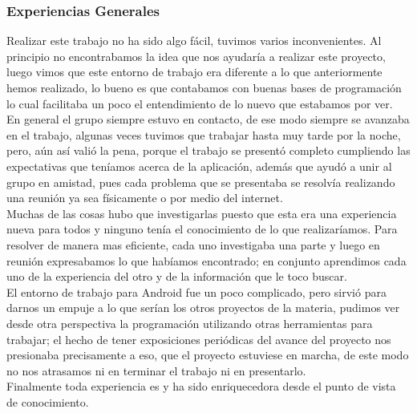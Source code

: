 \documentclass[10pt]{article}
\begin{document}
{\begin{flushleft}
\subsubsection{Experiencias Generales}
Realizar este trabajo no ha sido algo f\'acil, tuvimos varios inconvenientes. Al principio no encontrabamos la idea que nos ayudar\'ia a realizar este proyecto, luego vimos que este entorno de trabajo era diferente a lo que anteriormente hemos realizado, lo bueno es que contabamos con buenas bases de programaci\'on lo cual facilitaba un poco el entendimiento de lo nuevo que estabamos por ver.\\
En general el grupo siempre estuvo en contacto, de ese modo siempre se avanzaba en el trabajo, algunas veces tuvimos que trabajar hasta muy tarde por la noche, pero, a\'un as\'i vali\'o la pena, porque el trabajo se present\'o completo cumpliendo las expectativas que ten\'iamos acerca de la aplicaci\'on, adem\'as que ayud\'o a unir al grupo en amistad, pues cada problema que se presentaba se resolv\'ia realizando una reuni\'on ya sea f\'isicamente o por medio del internet.\\
Muchas de las cosas hubo que investigarlas puesto que esta era una experiencia nueva para todos y ninguno ten\'ia el conocimiento de lo que realizar\'iamos. Para resolver de manera mas eficiente, cada uno investigaba una parte y luego en reuni\'on expresabamos lo que hab\'iamos encontrado; en conjunto aprendimos cada uno de la experiencia del otro y de la informaci\'on que le toco buscar.\\
El entorno de trabajo para Android fue un poco complicado, pero sirvi\'o para darnos un empuje a lo que ser\'ian los otros proyectos de la materia, pudimos ver desde otra perspectiva la programaci\'on utilizando otras herramientas para trabajar; el hecho de tener exposiciones peri\'odicas del avance del proyecto nos presionaba precisamente a eso, que el proyecto estuviese en marcha, de este modo no nos atrasamos ni en terminar el trabajo ni en presentarlo.\\
\vspace{0.1in}Finalmente toda experiencia es y ha sido enriquecedora desde el punto de vista de conocimiento.

\end{flushleft}}
\end{document}
